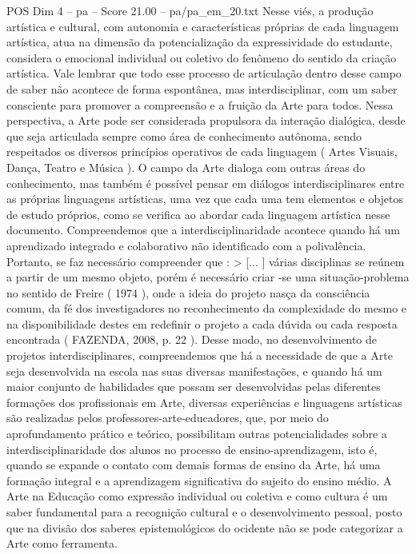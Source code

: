 \begin{textsample}{POS Dim 4 – pa – Score 21.00 – pa/pa\_em\_20.txt}
Nesse viés, a produção artística e cultural, com autonomia e características próprias de cada linguagem artística, atua na dimensão da potencialização da expressividade do estudante, considera o emocional individual ou coletivo do fenômeno do sentido da criação artística.
Vale lembrar que todo esse processo de articulação dentro desse campo de saber não acontece de forma espontânea, mas interdisciplinar, com um saber consciente para promover a compreensão e a fruição da Arte para todos.
Nessa perspectiva, a Arte pode ser considerada propulsora da interação dialógica, desde que seja articulada sempre como área de conhecimento autônoma, sendo respeitados os diversos princípios operativos de cada linguagem ( Artes Visuais, Dança, Teatro e Música ).
O campo da Arte dialoga com outras áreas do conhecimento, mas também é possível pensar em diálogos interdisciplinares entre as próprias linguagens artísticas, uma vez que cada uma tem elementos e objetos de estudo próprios, como se verifica ao abordar cada linguagem artística nesse documento.
Compreendemos que a interdisciplinaridade acontece quando há um aprendizado integrado e colaborativo não identificado com a polivalência.
Portanto, se faz necessário compreender que : > [... ] várias disciplinas se reúnem a partir de um mesmo objeto, porém é necessário criar -se uma situação-problema no sentido de Freire ( 1974 ), onde a ideia do projeto nasça da consciência comum, da fé dos investigadores no reconhecimento da complexidade do mesmo e na disponibilidade destes em redefinir o projeto a cada dúvida ou cada resposta encontrada ( FAZENDA, 2008, p. 22 ).
Desse modo, no desenvolvimento de projetos interdisciplinares, compreendemos que há a necessidade de que a Arte seja desenvolvida na escola nas suas diversas manifestações, e quando há um maior conjunto de habilidades que possam ser desenvolvidas pelas diferentes formações dos profissionais em Arte, diversas experiências e linguagens artísticas são realizadas pelos professores-arte-educadores, que, por meio do aprofundamento prático e teórico, possibilitam outras potencialidades sobre a interdisciplinaridade dos alunos no processo de ensino-aprendizagem, isto é, quando se expande o contato com demais formas de ensino da Arte, há uma formação integral e a aprendizagem significativa do sujeito do ensino médio.
A Arte na Educação como expressão individual ou coletiva e como cultura é um saber fundamental para a recognição cultural e o desenvolvimento pessoal, posto que na divisão dos saberes epistemológicos do ocidente não se pode categorizar a Arte como ferramenta.

\end{textsample}
